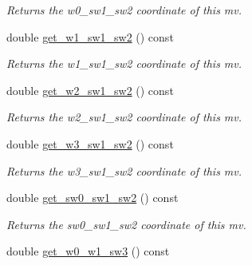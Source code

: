 \begin{DoxyCompactItemize}
\begin{DoxyCompactList}\small\item\em Returns the w0\-\_\-sw1\-\_\-sw2 coordinate of this mv. \end{DoxyCompactList}\item 
\hypertarget{classe3ga_1_1mv_aeeb91f06532cf57051fa3eb65bbe4236}{double \hyperlink{classe3ga_1_1mv_aeeb91f06532cf57051fa3eb65bbe4236}{get\-\_\-w1\-\_\-sw1\-\_\-sw2} () const }\label{classe3ga_1_1mv_aeeb91f06532cf57051fa3eb65bbe4236}

\begin{DoxyCompactList}\small\item\em Returns the w1\-\_\-sw1\-\_\-sw2 coordinate of this mv. \end{DoxyCompactList}\item 
\hypertarget{classe3ga_1_1mv_a6cfbcd0e08ee6ac87b4d6be9a2c4985e}{double \hyperlink{classe3ga_1_1mv_a6cfbcd0e08ee6ac87b4d6be9a2c4985e}{get\-\_\-w2\-\_\-sw1\-\_\-sw2} () const }\label{classe3ga_1_1mv_a6cfbcd0e08ee6ac87b4d6be9a2c4985e}

\begin{DoxyCompactList}\small\item\em Returns the w2\-\_\-sw1\-\_\-sw2 coordinate of this mv. \end{DoxyCompactList}\item 
\hypertarget{classe3ga_1_1mv_a67396196fde705b25ea195487451c685}{double \hyperlink{classe3ga_1_1mv_a67396196fde705b25ea195487451c685}{get\-\_\-w3\-\_\-sw1\-\_\-sw2} () const }\label{classe3ga_1_1mv_a67396196fde705b25ea195487451c685}

\begin{DoxyCompactList}\small\item\em Returns the w3\-\_\-sw1\-\_\-sw2 coordinate of this mv. \end{DoxyCompactList}\item 
\hypertarget{classe3ga_1_1mv_a4e7a50d8a504dfe1ff19662d77db6b04}{double \hyperlink{classe3ga_1_1mv_a4e7a50d8a504dfe1ff19662d77db6b04}{get\-\_\-sw0\-\_\-sw1\-\_\-sw2} () const }\label{classe3ga_1_1mv_a4e7a50d8a504dfe1ff19662d77db6b04}

\begin{DoxyCompactList}\small\item\em Returns the sw0\-\_\-sw1\-\_\-sw2 coordinate of this mv. \end{DoxyCompactList}\item 
\hypertarget{classe3ga_1_1mv_a66a5cc980274ffb2882fb1d4c5163bb1}{double \hyperlink{classe3ga_1_1mv_a66a5cc980274ffb2882fb1d4c5163bb1}{get\-\_\-w0\-\_\-w1\-\_\-sw3} () const }\label{classe3ga_1_1mv_a66a5cc980274ffb2882fb1d4c5163bb1}


\end{DoxyCompactItemize}
